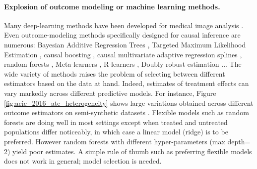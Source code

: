\documentclass{report}
\begin{document}
\paragraph{Explosion of outcome modeling or machine learning methods.}
Many deep-learning methods have been developed for medical
image analysis \citep{shen2017deep,monshi2020deep}.
Even outcome-modeling methods specifically designed for causal
inference are numerous: Bayesian Additive Regression Trees
\citep{hill_bayesian_2011}, Targeted Maximum Likelihood Estimation
\citep{laan_targeted_2011,schuler_targeted_2017}, causal boosting
\citep{powers_methods_2018}, causal multivariate adaptive regression
splines \citep{powers_methods_2018}, random forests
\citep{wager_estimation_2018, athey_generalized_2019},
Meta-learners \citep{kunzel_metalearners_2019}, R-learners
\citep{nie_quasioracle_2017}, Doubly robust estimation
\citep{chernozhukov_double_2018}...
The wide variety of methods raises the problem
of selecting between different estimators based on the data at hand.
%
Indeed, estimates of treatment effects can vary markedly across different
predictive models. For instance, Figure \ref{fig:acic_2016_ate_heterogeneity} shows
large variations obtained across different outcome estimators on
semi-synthetic datasets \citep{dorie_automated_2019}. Flexible models
such as random forests are doing well in most settings except
when treated and untreated populations differ noticeably, in
which case a linear model (ridge) is to be preferred.
However random forests with different hyper-parameters
(max depth= 2) yield poor estimates.
A simple rule of thumb such as preferring flexible models does not work in
general; model selection is needed.
\end{document}
